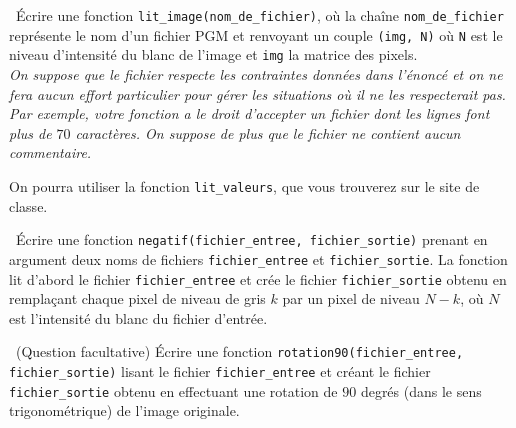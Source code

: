 \question\ Écrire une fonction \texttt{lit\_image(nom\_de\_fichier)}, où
   la chaîne \texttt{nom\_de\_fichier} représente le nom  d'un fichier PGM et renvoyant un couple \texttt{(img, N)} où \texttt{N} est
   le niveau d'intensité du blanc de l'image et \texttt{img} la matrice des
   pixels. \\ 
   \emph{On suppose que le fichier respecte les contraintes données
   dans l'énoncé et on ne fera aucun effort particulier pour gérer les
   situations où il ne les respecterait pas. \\
   Par exemple, votre
   fonction a le droit d'accepter un fichier dont les lignes
   font plus de $70$ caractères. On suppose de plus que le fichier ne
   contient aucun commentaire.}\\
\begin{rem}
  On pourra utiliser la fonction \texttt{lit\_valeurs}, que vous trouverez sur le site de classe.
\end{rem}

\question\ Écrire une fonction \texttt{negatif(fichier\_entree, fichier\_sortie)} prenant en argument
   deux noms de fichiers \texttt{fichier\_entree} et \texttt{fichier\_sortie}. La fonction lit d'abord le fichier
   \texttt{fichier\_entree} et crée le fichier \texttt{fichier\_sortie} obtenu en remplaçant chaque pixel
   de niveau de gris $k$ par un pixel de niveau $N-k$, où $N$ est l'intensité du blanc du fichier d'entrée.
   
\question\ (Question facultative) Écrire une fonction \texttt{rotation90(fichier\_entree, fichier\_sortie)}
   lisant le fichier 
   \texttt{fichier\_entree} et créant le fichier \texttt{fichier\_sortie} obtenu en effectuant une rotation
   de $90$ degrés (dans le sens trigonométrique) de l'image originale.
